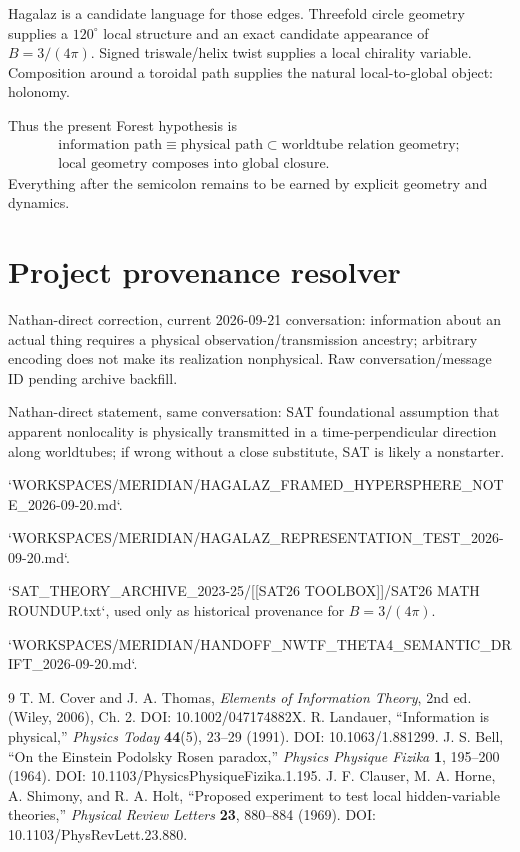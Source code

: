 \documentclass[11pt]{article}
\begin{document}
Hagalaz is a candidate language for those edges. Threefold circle geometry supplies a $120^\circ$ local structure and an exact candidate appearance of $B=3/(4\pi)$. Signed triswale/helix twist supplies a local chirality variable. Composition around a toroidal path supplies the natural local-to-global object: holonomy.

Thus the present Forest hypothesis is
\begin{equation}
\boxed{\begin{gathered}
\text{information path}\equiv\text{physical path}\subset\text{worldtube relation geometry};\\
\text{local geometry composes into global closure}.
\end{gathered}}
\end{equation}
Everything after the semicolon remains to be earned by explicit geometry and dynamics.

\section*{Project provenance resolver}
\begin{description}[leftmargin=1.7cm,style=nextline]\small
\item[P:N21a] Nathan-direct correction, current 2026-09-21 conversation: information about an actual thing requires a physical observation/transmission ancestry; arbitrary encoding does not make its realization nonphysical. Raw conversation/message ID pending archive backfill.
\item[P:N21b] Nathan-direct statement, same conversation: SAT foundational assumption that apparent nonlocality is physically transmitted in a time-perpendicular direction along worldtubes; if wrong without a close substitute, SAT is likely a nonstarter.
\item[P:HAG-R] `WORKSPACES/MERIDIAN/HAGALAZ_FRAMED_HYPERSPHERE_NOTE_2026-09-20.md`.
\item[P:HAG-T] `WORKSPACES/MERIDIAN/HAGALAZ_REPRESENTATION_TEST_2026-09-20.md`.
\item[P:B-HIST] `SAT_THEORY_ARCHIVE_2023-25/[[SAT26 TOOLBOX]]/SAT26 MATH ROUNDUP.txt`, used only as historical provenance for $B=3/(4\pi)$.
\item[P:T4-DRIFT] `WORKSPACES/MERIDIAN/HANDOFF_NWTF_THETA4_SEMANTIC_DRIFT_2026-09-20.md`.
\end{description}

\begin{thebibliography}{9}
 T. M. Cover and J. A. Thomas, \emph{Elements of Information Theory}, 2nd ed. (Wiley, 2006), Ch. 2. DOI: 10.1002/047174882X.
 R. Landauer, ``Information is physical,'' \emph{Physics Today} \textbf{44}(5), 23--29 (1991). DOI: 10.1063/1.881299.
 J. S. Bell, ``On the Einstein Podolsky Rosen paradox,'' \emph{Physics Physique Fizika} \textbf{1}, 195--200 (1964). DOI: 10.1103/PhysicsPhysiqueFizika.1.195.
 J. F. Clauser, M. A. Horne, A. Shimony, and R. A. Holt, ``Proposed experiment to test local hidden-variable theories,'' \emph{Physical Review Letters} \textbf{23}, 880--884 (1969). DOI: 10.1103/PhysRevLett.23.880.
\end{thebibliography}
\end{document}
